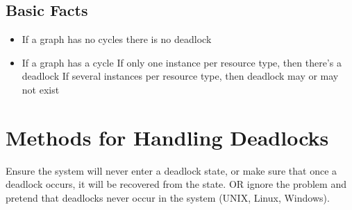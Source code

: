 \documentclass{book/custombook}
\begin{document}
            \subsection{Basic Facts}
                \begin{itemize}
                    \item If a graph has no cycles there is no deadlock
                    \item If a graph has a cycle
                        \subitem If only one instance per resource type, then there's a deadlock
                        \subitem If several instances per resource type, then deadlock may or may not exist
                \end{itemize}
        \section{Methods for Handling Deadlocks}
            Ensure the system will never enter a deadlock state, or make sure that once a deadlock occurs,
            it will be recovered from the state. OR ignore the problem and pretend that deadlocks never occur
            in the system (UNIX, Linux, Windows).\\
\end{document}
